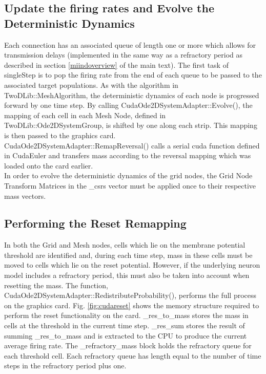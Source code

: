 \documentclass[utf8]{frontiers_suppmat} %
\begin{document}
\subsection{Update the firing rates and Evolve the Deterministic Dynamics}

Each connection has an associated queue of length one or more which allows for transmission delays (implemented in the same way as a refractory period as described in section \ref{miindoverview} of the main text). The first task of singleStep is to pop the firing rate from the end of each queue to be passed to the associated target populations. As with the algorithm in TwoDLib::MeshAlgorithm, the deterministic dynamics of each node is progressed forward by one time step. By calling CudaOde2DSystemAdapter::Evolve(), the mapping of each cell in each Mesh Node, defined in TwoDLib::Ode2DSystemGroup, is shifted by one along each strip. This mapping is then passed to the graphics card. CudaOde2DSystemAdapter::RemapReversal() calls a serial cuda function defined in CudaEuler and transfers mass according to the reversal mapping which was loaded onto the card earlier. \\
In order to evolve the deterministic dynamics of the grid nodes, the Grid Node Transform Matrices in the \_csrs vector must be applied once to their respective mass vectors. \\

\subsection{Performing the Reset Remapping}

In both the Grid and Mesh nodes, cells which lie on the membrane potential threshold are identified and, during each time step, mass in these cells must be moved to cells which lie on the reset potential. However, if the underlying neuron model includes a refractory period, this must also be taken into account when resetting the mass. The function, CudaOde2DSystemAdapter::RedistributeProbability(), performs the full process on the graphics card. Fig. \ref{fig:cudareset} shows the memory structure required to perform the reset functionality on the card. \_res\_to\_mass stores the mass in cells at the threshold in the current time step. \_res\_sum stores the result of summing \_res\_to\_mass and is extracted to the CPU to produce the current average firing rate. The \_refractory\_mass block holds the refractory queue for each threshold cell. Each refractory queue has length equal to the number of time steps in the refractory period plus one. \\
\end{document}
